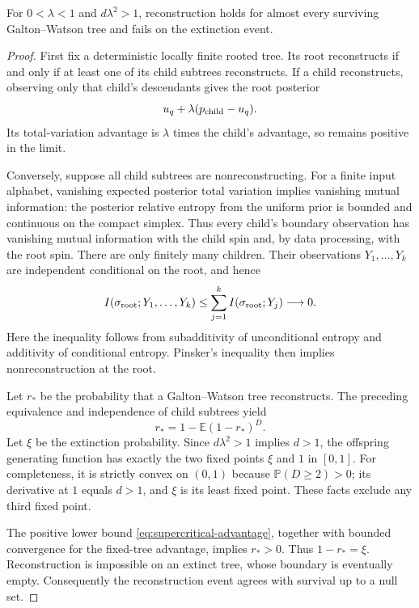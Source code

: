 \begin{lemma}
\label{lem:survival-reconstruction}
For $0<\lambda<1$ and $d\lambda^2>1$, reconstruction holds for almost
every surviving Galton--Watson tree and fails on the extinction event.
\end{lemma}

\begin{proof}
First fix a deterministic locally finite rooted tree.  Its root
reconstructs if and only if at least one of its child subtrees reconstructs.
If a child reconstructs, observing only that child's descendants gives
the root posterior
\[
 u_q+\lambda(p_{\rm child}-u_q).
\]
Its total-variation advantage is $\lambda$ times the child's advantage,
so remains positive in the limit.

Conversely, suppose all child subtrees are nonreconstructing.  For a finite
input alphabet, vanishing expected posterior total variation implies
vanishing mutual information: the posterior relative entropy from the
uniform prior is bounded and continuous on the compact simplex.  Thus
every child's boundary observation has vanishing mutual information with
the child spin and, by data processing, with the root spin.  There are
only finitely many children.  Their observations $Y_1,\ldots,Y_k$ are
independent conditional on the root, and hence
\[
 I(\sigma_{\rm root};Y_1,\ldots,Y_k)
 \le\sum_{j=1}^k I(\sigma_{\rm root};Y_j)\longrightarrow0.
\]
Here the inequality follows from subadditivity of unconditional entropy
and additivity of conditional entropy.  Pinsker's inequality then implies
nonreconstruction at the root.

Let $r_* $ be the probability that a Galton--Watson tree reconstructs.
The preceding equivalence and independence of child subtrees yield
\[
 r_*=1-\mathbb E(1-r_*)^D.
\]
Let $\xi$ be the extinction probability.  Since
$d\lambda^2>1$ implies $d>1$, the offspring generating function has
exactly the two fixed points $\xi$ and $1$ in $[0,1]$.  For completeness,
it is strictly convex on $(0,1)$ because $\mathbb P(D\ge2)>0$;
its derivative at $1$ equals $d>1$, and $\xi$ is its least fixed point.
These facts exclude any third fixed point.

The positive lower bound \eqref{eq:supercritical-advantage}, together
with bounded convergence for the fixed-tree advantage, implies $r_*>0$.
Thus $1-r_*=\xi$.  Reconstruction is impossible on an extinct tree,
whose boundary is eventually empty.  Consequently the reconstruction
event agrees with survival up to a null set.
\end{proof}


